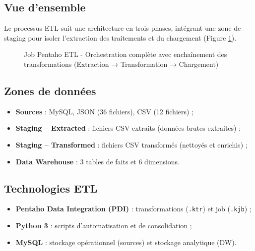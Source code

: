 \documentclass[12pt,a4paper]{report}
\begin{document}
\subsection{Vue d'ensemble}

Le processus ETL suit une architecture en trois phases, intégrant une zone de staging pour isoler l'extraction des traitements et du chargement (Figure \ref{fig:flux_etl}).

\begin{figure}[H]
    \centering
    \caption{Job Pentaho ETL - Orchestration complète avec enchaînement des transformations (Extraction → Transformation → Chargement)}
    \label{fig:flux_etl}
\end{figure}

\subsection{Zones de données}

\begin{itemize}
    \item \textbf{Sources} : MySQL, JSON (36 fichiers), CSV (12 fichiers) ;
    \item \textbf{Staging -- Extracted} : fichiers CSV extraits (données brutes extraites) ;
    \item \textbf{Staging -- Transformed} : fichiers CSV transformés (nettoyés et enrichis) ;
    \item \textbf{Data Warehouse} : 3 tables de faits et 6 dimensions.
\end{itemize}

\subsection{Technologies ETL}

\begin{itemize}
    \item \textbf{Pentaho Data Integration (PDI)} : transformations (\texttt{.ktr}) et job (\texttt{.kjb}) ;
    \item \textbf{Python 3} : scripts d'automatisation et de consolidation ;
    \item \textbf{MySQL} : stockage opérationnel (sources) et stockage analytique (DW).
\end{itemize}
\end{document}
